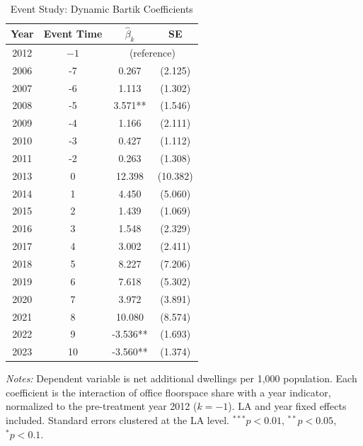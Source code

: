 \begin{table}[htbp]
\centering
\caption{Event Study: Dynamic Bartik Coefficients}
\label{tab:eventstudy}
\begin{tabular}{cccc}
\hline\hline
Year & Event Time & $\hat{\beta}_k$ & SE \\
\hline
2012 & $-1$ & \multicolumn{2}{c}{(reference)} \\
2006 & -7 & 0.267 & (2.125) \\
2007 & -6 & 1.113 & (1.302) \\
2008 & -5 & 3.571** & (1.546) \\
2009 & -4 & 1.166 & (2.111) \\
2010 & -3 & 0.427 & (1.112) \\
2011 & -2 & 0.263 & (1.308) \\
2013 & 0 & 12.398 & (10.382) \\
2014 & 1 & 4.450 & (5.060) \\
2015 & 2 & 1.439 & (1.069) \\
2016 & 3 & 1.548 & (2.329) \\
2017 & 4 & 3.002 & (2.411) \\
2018 & 5 & 8.227 & (7.206) \\
2019 & 6 & 7.618 & (5.302) \\
2020 & 7 & 3.972 & (3.891) \\
2021 & 8 & 10.080 & (8.574) \\
2022 & 9 & -3.536** & (1.693) \\
2023 & 10 & -3.560** & (1.374) \\
\hline\hline
\end{tabular}
\begin{minipage}{0.85\textwidth}
\vspace{0.3em}
\footnotesize
\textit{Notes:} Dependent variable is net additional dwellings per 1,000 population. Each coefficient is the interaction of office floorspace share with a year indicator, normalized to the pre-treatment year 2012 ($k = -1$). LA and year fixed effects included. Standard errors clustered at the LA level. $^{***}p<0.01$, $^{**}p<0.05$, $^{*}p<0.1$.
\end{minipage}
\end{table}
